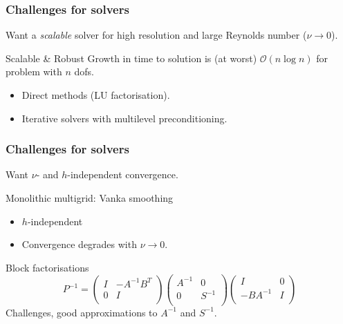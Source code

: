 \documentclass[presentation]{beamer}
\newcommand{\cmark}{\ding{51}}
\newcommand{\xmark}{\ding{55}}
\begin{document}
\begin{frame}
  \frametitle{Challenges for solvers}
  Want a \emph{scalable} solver for high resolution and large
  Reynolds number ($\nu \to 0$).
  \begin{block}{Scalable \& Robust}
    Growth in time to solution is (at worst)
    $\mathcal{O}(n\log n)$ for problem with $n$ dofs.
    \begin{itemize}
    \item[\xmark] Direct methods (LU factorisation).
    \item[\cmark] Iterative solvers with multilevel preconditioning.
    \end{itemize}
  \end{block}
\end{frame}
\begin{frame}
  \frametitle{Challenges for solvers}
  Want $\nu$- and $h$-independent convergence.
  \begin{block}{Monolithic multigrid: Vanka smoothing}
    \begin{itemize}
    \item[\cmark] $h$-independent
    \item[\xmark] Convergence degrades with $\nu \to 0$.
    \end{itemize}
  \end{block}
  \begin{block}{Block factorisations}
    \begin{equation*}
      P^{-1} =
      \begin{pmatrix}
        I   & -A^{-1} B^T \\
        0 & I \\
      \end{pmatrix}
      \begin{pmatrix}
        A^{-1}  & 0 \\
        0 & S^{-1} \\
      \end{pmatrix}
      \begin{pmatrix}
        I   & 0 \\
        -BA^{-1} & I \\
      \end{pmatrix}
    \end{equation*}
    Challenges, good approximations to $A^{-1}$ and $S^{-1}$.
  \end{block}
\end{frame}
\end{document}
